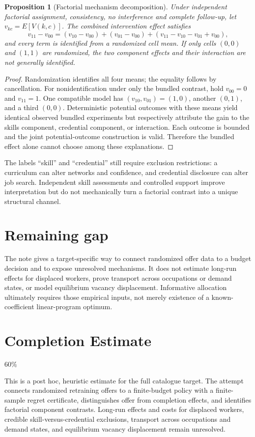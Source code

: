 \documentclass[11pt]{article}
\newtheorem{proposition}[theorem]{Proposition}
\theoremstyle{remark}
\begin{document}
\begin{proposition}[Factorial mechanism decomposition]
Under independent factorial assignment, consistency, no interference and complete follow-up, let $v_{kc}=E[V(k,c)]$. The combined intervention effect satisfies
\[
 v_{11}-v_{00}=(v_{10}-v_{00})+(v_{01}-v_{00})+
 (v_{11}-v_{10}-v_{01}+v_{00}),
\]
and every term is identified from a randomized cell mean. If only cells $(0,0)$ and $(1,1)$ are randomized, the two component effects and their interaction are not generally identified.
\end{proposition}
\begin{proof}
Randomization identifies all four means; the equality follows by cancellation. For nonidentification under only the bundled contrast, hold $v_{00}=0$ and $v_{11}=1$. One compatible model has $(v_{10},v_{01})=(1,0)$, another $(0,1)$, and a third $(0,0)$. Deterministic potential outcomes with these means yield identical observed bundled experiments but respectively attribute the gain to the skills component, credential component, or interaction. Each outcome is bounded and the joint potential-outcome construction is valid. Therefore the bundled effect alone cannot choose among these explanations.
\end{proof}
The labels ``skill'' and ``credential'' still require exclusion restrictions: a curriculum can alter networks and confidence, and credential disclosure can alter job search. Independent skill assessments and controlled support improve interpretation but do not mechanically turn a factorial contrast into a unique structural channel.

\section*{Remaining gap}
The note gives a target-specific way to connect randomized offer data to a budget decision and to expose unresolved mechanisms. It does not estimate long-run effects for displaced workers, prove transport across occupations or demand states, or model equilibrium vacancy displacement. Informative allocation ultimately requires those empirical inputs, not merely existence of a known-coefficient linear-program optimum.

\section{Completion Estimate}
60\%

This is a post hoc, heuristic estimate for the full catalogue target.
The attempt connects randomized retraining offers to a finite-budget policy with a finite-sample regret certificate, distinguishes offer from completion effects, and identifies factorial component contrasts. Long-run effects and costs for displaced workers, credible skill-versus-credential exclusions, transport across occupations and demand states, and equilibrium vacancy displacement remain unresolved.
\end{document}
